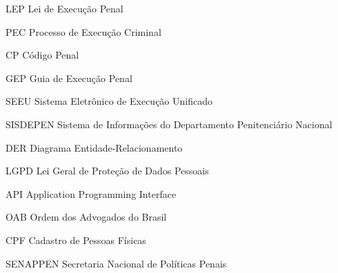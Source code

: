 \begin{siglas}
  \item[LEP] {Lei de Execução Penal}
  \item[PEC] {Processo de Execução Criminal}
  \item[CP]  {Código Penal}
  \item[GEP] {Guia de Execução Penal}
  \item[SEEU] {Sistema Eletrônico de Execução Unificado}
  \item[SISDEPEN] {Sistema de Informações do Departamento Penitenciário Nacional}
  \item[DER] {Diagrama Entidade-Relacionamento}
  \item[LGPD] {Lei Geral de Proteção de Dados Pessoais}
  \item[API] {Application Programming Interface}
  \item[OAB] {Ordem dos Advogados do Brasil}
  \item[CPF] {Cadastro de Pessoas Físicas}
  \item[SENAPPEN] {Secretaria Nacional de Políticas Penais}
\end{siglas}
